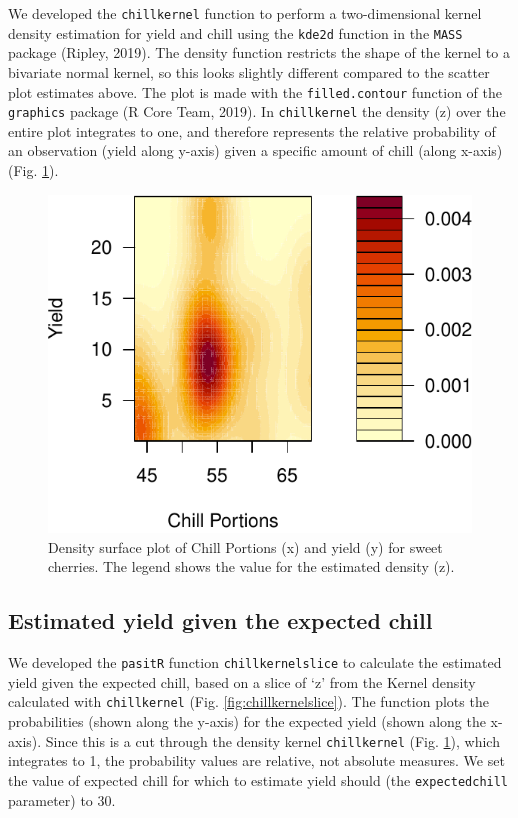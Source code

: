 \documentclass[]{article}
\begin{document}
We developed the \texttt{chillkernel} function to perform a
two-dimensional kernel density estimation for yield and chill using the
\texttt{kde2d} function in the \texttt{MASS} package (Ripley, 2019). The
density function restricts the shape of the kernel to a bivariate normal
kernel, so this looks slightly different compared to the scatter plot
estimates above. The plot is made with the \texttt{filled.contour}
function of the \texttt{graphics} package (R Core Team, 2019). In
\texttt{chillkernel} the density (z) over the entire plot integrates to
one, and therefore represents the relative probability of an observation
(yield along y-axis) given a specific amount of chill (along x-axis)
(Fig. \ref{fig:chillkernel}).

\begin{figure}
\centering
\includegraphics{Abstract_SHE_Chill_Yield_Model_files/figure-latex/chillkernel-1.pdf}
\caption{\label{fig:chillkernel}Density surface plot of Chill Portions
(x) and yield (y) for sweet cherries. The legend shows the value for the
estimated density (z).}
\end{figure}

\hypertarget{estimated-yield-given-the-expected-chill}{%
\subsection{Estimated yield given the expected
chill}\label{estimated-yield-given-the-expected-chill}}

We developed the \texttt{pasitR} function \texttt{chillkernelslice} to
calculate the estimated yield given the expected chill, based on a slice
of `z' from the Kernel density calculated with \texttt{chillkernel}
(Fig. \ref{fig:chillkernelslice}). The function plots the probabilities
(shown along the y-axis) for the expected yield (shown along the
x-axis). Since this is a cut through the density kernel
\texttt{chillkernel} (Fig. \ref{fig:chillkernel}), which integrates to
1, the probability values are relative, not absolute measures. We set
the value of expected chill for which to estimate yield should (the
\texttt{expectedchill} parameter) to 30.
\end{document}
